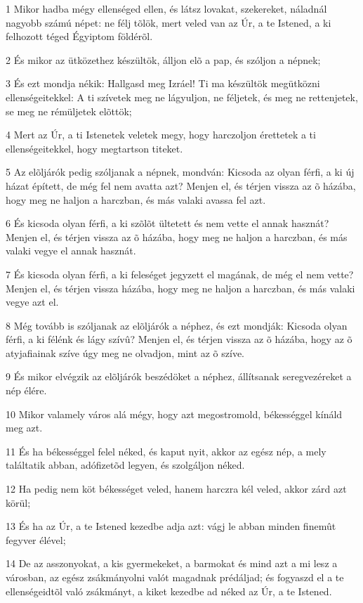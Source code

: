 \par 1 Mikor hadba mégy ellenséged ellen, és látsz lovakat, szekereket, náladnál nagyobb számú népet: ne félj tõlök, mert veled van az Úr, a te Istened, a ki felhozott téged Égyiptom földérõl.
\par 2 És mikor az ütközethez készültök, álljon elõ a pap, és szóljon a népnek;
\par 3 És ezt mondja nékik: Hallgasd meg Izráel! Ti ma készültök megütközni ellenségeitekkel: A ti szívetek meg ne lágyuljon, ne féljetek, és meg ne rettenjetek, se meg ne rémüljetek elõttök;
\par 4 Mert az Úr, a ti Istenetek veletek megy, hogy harczoljon érettetek a ti ellenségeitekkel, hogy megtartson titeket.
\par 5 Az elõljárók pedig szóljanak a népnek, mondván: Kicsoda az olyan férfi, a ki új házat épített, de még fel nem avatta azt? Menjen el, és térjen vissza az õ házába, hogy meg ne haljon a harczban, és más valaki avassa fel azt.
\par 6 És kicsoda olyan férfi, a ki szõlõt ültetett és nem vette el annak hasznát? Menjen el, és térjen vissza az õ házába, hogy meg ne haljon a harczban, és más valaki vegye el annak hasznát.
\par 7 És kicsoda olyan férfi, a ki feleséget jegyzett el magának, de még el nem vette? Menjen el, és térjen vissza házába, hogy meg ne haljon a harczban, és más valaki vegye azt el.
\par 8 Még tovább is szóljanak az elõljárók a néphez, és ezt mondják: Kicsoda olyan férfi, a ki félénk és lágy szívû? Menjen el, és térjen vissza az õ házába, hogy az õ atyjafiainak szíve úgy meg ne olvadjon, mint az õ szíve.
\par 9 És mikor elvégzik az elõljárók beszédöket a néphez, állítsanak seregvezéreket a nép élére.
\par 10 Mikor valamely város alá mégy, hogy azt megostromold, békességgel kínáld meg azt.
\par 11 És ha békességgel felel néked, és kaput nyit, akkor az egész nép, a mely találtatik abban, adófizetõd legyen, és szolgáljon néked.
\par 12 Ha pedig nem köt békességet veled, hanem harczra kél veled, akkor zárd azt körül;
\par 13 És ha az Úr, a te Istened kezedbe adja azt: vágj le abban minden finemût fegyver élével;
\par 14 De az asszonyokat, a kis gyermekeket, a barmokat és mind azt a mi lesz a városban, az egész zsákmányolni valót magadnak prédáljad; és fogyaszd el a te ellenségeidtõl való zsákmányt, a kiket kezedbe ad néked az Úr, a te Istened.
